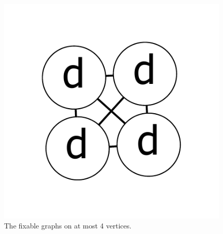 \documentclass[12pt]{article}
\theoremstyle{plain}
\theoremstyle{definition}
\theoremstyle{remark}
\begin{document}
\begin{figure}[!htb]
\includegraphics[scale=0.25]{Superabundance/all/111111[3,3,3,3].pdf}
\caption{The fixable graphs on at most 4 vertices.}
\label{fig:fixable3}
\label{fig:fixable4}
\end{figure}
\end{document}
